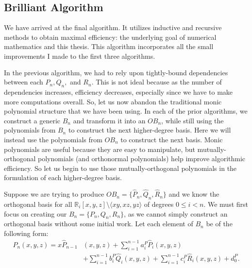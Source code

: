 \documentclass[letterpaper, 12pt]{article}
\begin{document}


\newpage
\begin{centering}\section{Brilliant Algorithm}\end{centering}

We have arrived at the final algorithm. It utilizes inductive and recursive methods to obtain maximal efficiency: the underlying goal of numerical mathematics and this thesis. This algorithm incorporates all the small improvements I made to the first three algorithms.

In the previous algorithm, we had to rely upon tightly-bound dependencies between each $P_n, Q_n,$ and $R_n$. This is not ideal because as the number of dependencies increases, efficiency decreases, especially since we have to make more computations overall. So, let us now abandon the traditional monic polynomial structure that we have been using. In each of the prior algorithms, we construct a generic $B_n$ and transform it into an $OB_n$, while still using the polynomials from $B_n$ to construct the next higher-degree basis. Here we will instead use the polynomials from $OB_n$ to construct the next basis. Monic polynomials are useful because they are easy to manipulate, but mutually-orthogonal polynomials (and orthonormal polynomials) help improve algorithmic efficiency. So let us begin to use those mutually-orthogonal polynomials in the formulation of each higher-degree basis.

Suppose we are trying to produce $OB_n = \{\hat{P}_n, \hat{Q}_n, \hat{R}_n\}$ and we know the orthogonal basis for all $\mathbb{R}_i [x, y, z] \setminus \langle xy, xz, yz\rangle$ of degrees $0 \leq i < n$. We must first focus on creating our $B_n = \{P_n, Q_n, R_n\}$, as we cannot simply construct an orthogonal basis without some initial work. Let each element of $B_n$ be of the following form:
\begin{align*}
	P_n(x, y, z) = x\hat{P}_{n-1}&(x, y, z) + \sum_{i=1}^{n-1} a_i^P\hat{P}_i(x, y, z)\\ 
					&+ \sum_{i=1}^{n-1} b_i^P\hat{Q}_i(x, y, z) + \sum_{i=1}^{n-1} c_i^P\hat{R}_i(x, y, z) + d_0^P.
\end{align*}
\end{document}
